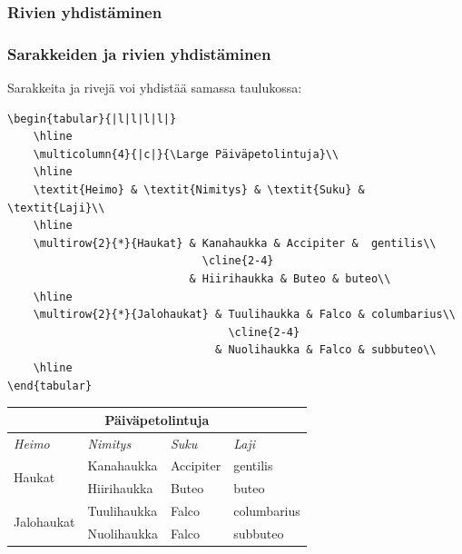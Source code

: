 \begin{frame}[fragile]
    \frametitle{Rivien yhdistäminen} 
    
\end{frame}
\begin{frame}[fragile]
    \frametitle{Sarakkeiden ja rivien yhdistäminen} 
    Sarakkeita ja rivejä voi yhdistää samassa taulukossa:\vaihto
    \begin{minipage}{8cm}
        \begin{scriptsize}
            \begin{verbatim}
\begin{tabular}{|l|l|l|l|}
    \hline
    \multicolumn{4}{|c|}{\Large Päiväpetolintuja}\\
    \hline
    \textit{Heimo} & \textit{Nimitys} & \textit{Suku} & \textit{Laji}\\
    \hline
    \multirow{2}{*}{Haukat} & Kanahaukka & Accipiter &  gentilis\\
                              \cline{2-4}
                            & Hiirihaukka & Buteo & buteo\\
    \hline
    \multirow{2}{*}{Jalohaukat} & Tuulihaukka & Falco & columbarius\\
                                  \cline{2-4}
                                & Nuolihaukka & Falco & subbuteo\\
    \hline
\end{tabular}
            \end{verbatim}
        \end{scriptsize}
    \end{minipage}
    \begin{table}[h!]
        \begin{serif}
            \begin{scriptsize}
                \begin{tabular}{|l|l|l|l|}
                    \hline
                    \multicolumn{4}{|c|}{\Large Päiväpetolintuja}\\
                    \hline
                    \textit{Heimo} & \textit{Nimitys} & \textit{Suku} & \textit{Laji}\\\hline
                    \multirow{2}{*}{Haukat} & Kanahaukka & Accipiter &  gentilis\\ \cline{2-4}
                                            & Hiirihaukka & Buteo & buteo\\ \hline
                    \multirow{2}{*}{Jalohaukat} & Tuulihaukka & Falco & columbarius\\ \cline{2-4}
                                                &Nuolihaukka & Falco & subbuteo\\ \hline
                \end{tabular}
            \end{scriptsize}
        \end{serif}
    \end{table}

\end{frame}
